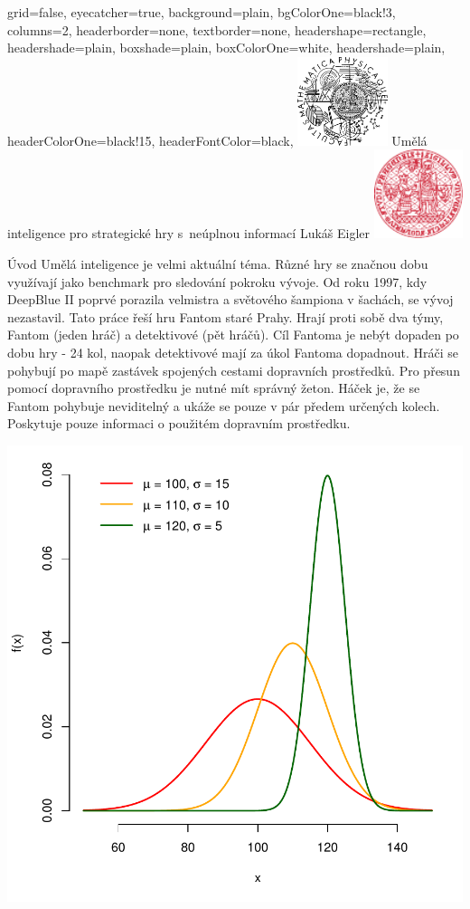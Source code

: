 \documentclass[portrait,a0paper,fontscale=0.25]{baposter}
\begin{document}
\color{black!80} %
\begin{poster}{grid=false,
	eyecatcher=true,
	background=plain,
	bgColorOne=black!3, %
	columns=2,
	headerborder=none,
	textborder=none,
	headershape=rectangle,
	headershade=plain,
	boxshade=plain,
	boxColorOne=white,
	headershade=plain,
	headerColorOne=black!15, %
	headerFontColor=black,
	}%
	{\includegraphics[height=7em]{logos/mff-black.pdf}}
	{Umělá inteligence pro strategické hry s~neúplnou informací}
	{\vspace{1ex} Lukáš Eigler}
	{\includegraphics[height=7em]{logos/uk-red.pdf}}


%
%

\begin{posterbox}[column=0,name=background]{Úvod}
Umělá inteligence je velmi aktuální téma. Různé hry se značnou dobu využívají jako benchmark pro sledování pokroku vývoje. Od roku 1997, kdy DeepBlue II poprvé porazila velmistra a světového šampiona v šachách, se vývoj nezastavil. 
Tato práce řeší hru Fantom staré Prahy. Hrají proti sobě dva týmy, Fantom (jeden hráč) a detektivové (pět hráčů). Cíl Fantoma je nebýt dopaden po dobu hry - 24 kol, naopak detektivové mají za úkol Fantoma dopadnout. Hráči se pohybují po mapě zastávek spojených cestami dopravních prostředků. Pro přesun pomocí dopravního prostředku je nutné mít správný žeton. Háček je, že se Fantom pohybuje neviditelný a ukáže se pouze v pár předem určených kolech. Poskytuje pouze informaci o použitém dopravním prostředku.

\begin{center}
\includegraphics[width=0.7\linewidth]{img/ukazka-obr02.pdf}
\end{center}


\end{posterbox}
\end{poster}
\end{document}
